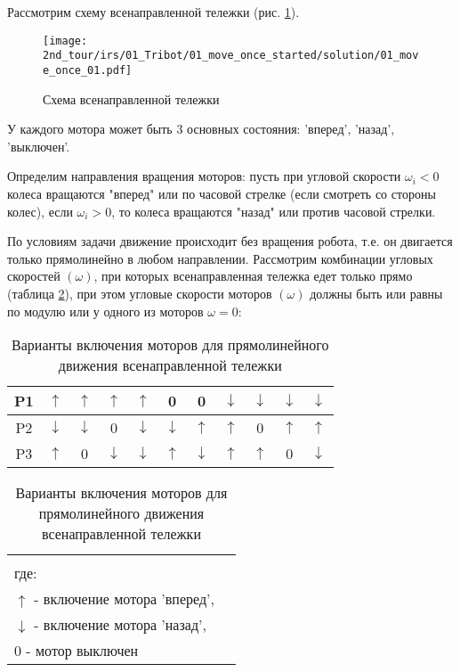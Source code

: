 \solutionSection

Рассмотрим схему всенаправленной тележки (рис. \ref{fig:01_move_once_01}).
\begin{figure}[H]
	\centering
	\texttt{[image: 2nd\_tour/irs/01\_Tribot/01\_move\_once\_started/solution/01\_move\_once\_01.pdf]}
	\caption{Схема всенаправленной тележки}
	\label{fig:01_move_once_01}
\end{figure}

У каждого мотора может быть 3 основных состояния: 'вперед', 'назад', 'выключен'.

Определим направления вращения моторов: пусть при угловой скорости $\omega_i < 0$ колеса вращаются "вперед" или по часовой стрелке (если смотреть со стороны колес), если $\omega_i > 0$, то колеса вращаются "назад" или против часовой стрелки.

По условиям задачи движение происходит без вращения робота, т.е. он двигается только прямолинейно в любом направлении. Рассмотрим комбинации угловых скоростей $(\omega)$, при которых всенаправленная тележка едет только прямо (таблица \ref{table:01_move_once_01}), при этом угловые скорости моторов $(\omega)$ должны быть или равны по модулю или у одного из моторов $\omega = 0$:

\begin{table}[H]
	\begin{center}
	\begin{tabular}{|c|c|c|c|c|c|c|c|c|c|c|}
		\hline
		P1 & $\uparrow$ & $\uparrow$ & $\uparrow$ & $\uparrow$ & 0 & 0 & $\downarrow$ & $\downarrow$ & $\downarrow$ & $\downarrow$ \\
		\hline
		P2 & $\downarrow$ & $\downarrow$ & 0 & $\downarrow$ & $\downarrow$ & $\uparrow$ & $\uparrow$ & 0 & $\uparrow$ & $\uparrow$\\
		\hline
		P3 & $\uparrow$ & 0 & $\downarrow$ & $\downarrow$ & $\uparrow$ & $\downarrow$ & $\uparrow$ & $\uparrow$ & 0 & $\downarrow$\\
		\hline
	\end{tabular}

	\begin{tabular}{c|c|c|c|c|c|c|c|c|c|c|c}
		\multicolumn{11}{c}{} \\
		\multicolumn{11}{l}{где:} \\
		\multicolumn{11}{l}{$\uparrow$ - включение мотора 'вперед',} \\
		\multicolumn{11}{l}{$\downarrow$ - включение мотора 'назад',} \\
		\multicolumn{11}{l}{$0$ - мотор выключен} \\
	\end{tabular} 
	\caption{Варианты включения моторов для прямолинейного движения всенаправленной тележки}
	\label{table:01_move_once_01}
	\end{center}
\end{table}

